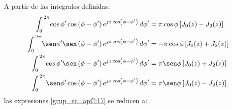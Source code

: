 A partir de las integrales definidas:
\begin{subequations}
\label{grup_ec_apC:18}
\begin{align}
\int_{0}^{\,2\pi}\!\cos\phi '\cos\left(\phi - \phi '\right)e^{jz\cos\left(\phi - \phi '\right)}\,d\phi ' &= \pi\cos\phi\left[J_0\!\left(z\right) - J_2\!\left(z\right)\right]
\label{ec_apC:77}\\
\int_{0}^{\,2\pi}\!\sen\phi '\sen\left(\phi - \phi '\right)e^{jz\cos\left(\phi - \phi '\right)}\,d\phi ' &= -\pi\cos\phi\left[J_0\!\left(z\right) + J_2\!\left(z\right)\right]
\label{ec_apC:78}\\
\int_{0}^{\,2\pi}\!\cos\phi '\sen\left(\phi - \phi '\right)e^{jz\cos\left(\phi - \phi '\right)}\,d\phi ' &= \pi\sen\phi\left[J_0\!\left(z\right) + J_2\!\left(z\right)\right]
\label{ec_apC:79}\\
\int_{0}^{\,2\pi}\!\sen\phi '\cos\left(\phi - \phi '\right)e^{jz\cos\left(\phi - \phi '\right)}\,d\phi ' &= \pi\sen\phi\left[J_0\!\left(z\right) - J_2\!\left(z\right)\right]
\label{ec_apC:80}
\end{align}
\end{subequations}
las expresiones \eqref{grup_ec_apC:17} se reducen a:
